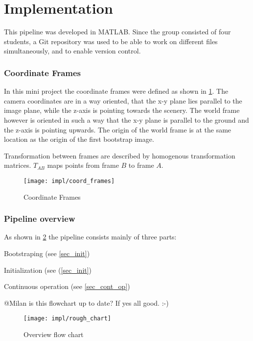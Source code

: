 \section{Implementation}

This pipeline was developed in MATLAB. Since the group consisted of four students, a Git repository was used to be able to work on different files simultaneously, and to enable version control.

\subsubsection{Coordinate Frames}
In this mini project the coordinate frames were defined as shown in \cref{img_coord_frames}. The camera coordinates are in a way oriented, that the x-y plane lies parallel to the image plane, while the z-axis is pointing towards the scenery. The world frame however is oriented in such a way that the x-y plane is parallel to the ground and the z-axis is pointing upwards. The origin of the world frame is at the same location as the origin of the first bootstrap image.

Transformation between frames are described by homogenous transformation matrices. $T_{AB}$ maps points from frame $B$ to frame $A$.

\begin{figure}[ht]
	\centering
	\texttt{[image: impl/coord\_frames]}
	\caption{Coordinate Frames}
	\label{img_coord_frames}
\end{figure}

\subsubsection{Pipeline overview}
As shown in \cref{img_flow_rough} the pipeline consists mainly of three parts:
\begin{compactenum}
	\item Bootstraping (see \cref{sec_init})
	\item Initialization (see (\cref{sec_init})
	\item Continuous operation (see \cref{sec_cont_op})
\end{compactenum}

\textcolor[rgb]{1,0,0}{@Milan is this flowchart up to date? If yes all good. :-)}

\begin{figure}[ht]
	\centering
	\texttt{[image: impl/rough\_chart]}
	\caption{Overview flow chart}
	\label{img_flow_rough}
\end{figure}

